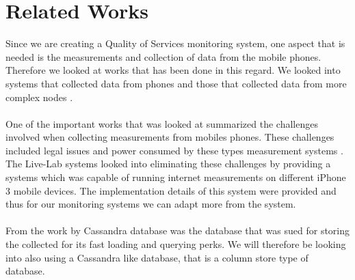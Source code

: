 \section{Related Works}
Since we are creating a Quality of Services monitoring system, one aspect that is needed is the measurements and collection of data from the mobile phones. Therefore we looked at works that has been done in this regard. We looked into systems that collected data from phones and those that collected data from more complex nodes \cite{7523537, Shepard:2011:LMW:1925019.1925023}. 
\paragraph{}
One of the important works that was looked at summarized the challenges involved when collecting measurements from mobiles phones. These challenges included legal issues and power consumed by these types measurement systems \cite{Shepard:2011:LMW:1925019.1925023}. The Live-Lab systems \cite{Shepard:2011:LMW:1925019.1925023} looked into eliminating these challenges by providing a systems which was capable of running internet measurements on different iPhone 3 mobile devices. The implementation details of this system were provided and thus for our monitoring systems we can adapt more from the system.
\paragraph{}
From the work by \cite{7523537,8255998} Cassandra database was the database that was sued for storing the collected for its fast loading and querying perks. We will therefore be looking into also using a Cassandra like database, that is a column store type of database.